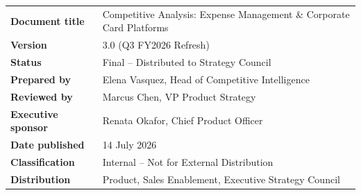 \begin{titlepage}
\begin{center}
\renewcommand{\arraystretch}{1.35}
\begin{tabularx}{0.92\linewidth}{@{}>{\color{ink}\bfseries}l@{\hspace{10mm}}Y@{}}
\toprule
Document title & Competitive Analysis: Expense Management \& Corporate Card Platforms \\
Version & 3.0 (Q3 FY2026 Refresh) \\
Status & Final -- Distributed to Strategy Council \\
Prepared by & Elena Vasquez, Head of Competitive Intelligence \\
Reviewed by & Marcus Chen, VP Product Strategy \\
Executive sponsor & Renata Okafor, Chief Product Officer \\
Date published & 14 July 2026 \\
Classification & Internal -- Not for External Distribution \\
Distribution & Product, Sales Enablement, Executive Strategy Council \\
\bottomrule
\end{tabularx}
\end{center}

\vspace{1cm}
\end{titlepage}
